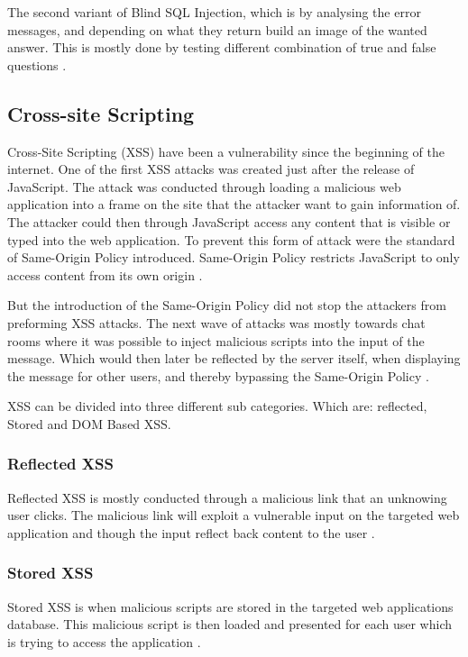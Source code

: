 The second variant of Blind SQL Injection, which is by analysing the error messages, and depending on what they return build an image of the wanted answer. This is mostly done by testing different combination of true and false questions \parencite{JustinClarke-Salt2009SIAa, Secure_Web}.


\subsection{Cross-site Scripting}
Cross-Site Scripting (XSS) have been a vulnerability since the beginning of the internet. One of the first XSS attacks was created just after the release of JavaScript. The attack was conducted through loading a malicious web application into a frame on the site that the attacker want to gain information of. The attacker could then through JavaScript access any content that is visible or typed into the web application. To prevent this form of attack were the standard of Same-Origin Policy introduced. Same-Origin Policy restricts JavaScript to only access content from its own origin \parencite{FogieSeth2007Xacs, w3csop}.

But the introduction of the Same-Origin Policy did not stop the attackers from preforming XSS attacks. The next wave of attacks was mostly towards chat rooms where it was possible to inject malicious scripts into the input of the message. Which would then later be reflected by the server itself, when displaying the message for other users, and thereby bypassing the Same-Origin Policy \parencite{FogieSeth2007Xacs}.

XSS can be divided into three different sub categories. Which are: reflected, Stored and DOM Based XSS.

\subsubsection{Reflected XSS}
Reflected XSS is mostly conducted through a malicious link that an unknowing user clicks. The malicious link will exploit a vulnerable input on the targeted web application and though the input reflect back content to the user \parencite{Secure_Web}.


\subsubsection{Stored XSS}
Stored XSS is when malicious scripts are stored in the targeted web applications database. This malicious script is then loaded and presented for each user which is trying to access the application \parencite{Secure_Web}.


